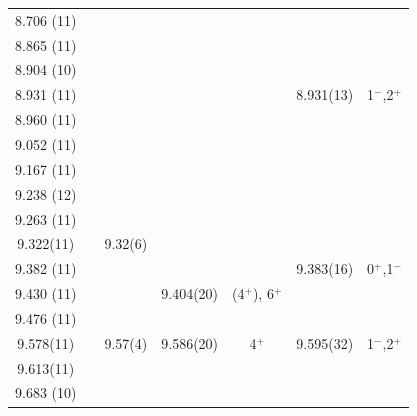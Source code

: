 \begin{center}
\begin{longtable}{cc c cc cc}
  8.706 (11)    &       &                   &                   &                   &                   &                   \\
  8.865 (11)    &       &                   &                   &                   &                   &                   \\
  8.904 (10)    &       &                   &                   &                   &                   &                   \\
 8.931 (11)     &       &                   &                   &                   &    8.931(13)      &   1$^-$,2$^+$     \\
  8.960 (11)    &       &                   &                   &                   &                   &                   \\
   9.052 (11)   &       &                   &                   &                   &                   &                   \\
  9.167 (11)    &       &                   &                   &                   &                   &                   \\
  9.238 (12)    &       &                   &                   &                   &                   &                   \\
  9.263 (11)    &       &                   &                   &                   &                   &                   \\
   9.322(11)    &       &     9.32(6)       &                   &                   &                   &                   \\
  9.382 (11)    &       &                   &                   &                   &    9.383(16)      &  0$^+$,1$^-$      \\
  9.430 (11)    &       &                   &     9.404(20)     & (4$^+$), 6$^+$    &                   &                   \\
  9.476 (11)    &       &                   &                   &                   &                   &                   \\
   9.578(11)    &       &     9.57(4)       &    9.586(20)      &   4$^+$           &   9.595(32)       &  1$^-$,2$^+$      \\
   9.613(11)    &       &                   &                   &                   &                   &                   \\
  9.683 (10)    &       &                   &                   &                   &                   &                   \\

\end{longtable}
\end{center}

